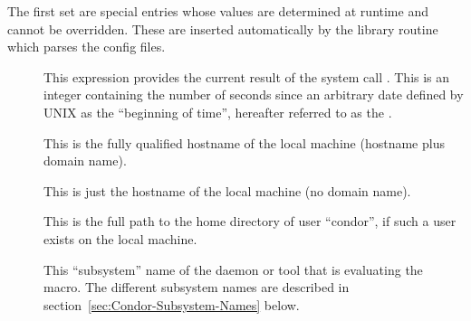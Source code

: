 The first set are special entries whose values are determined at
runtime and cannot be overridden.  These are inserted automatically by
the library routine which parses the config files.
\begin{description}
  
\item[] \label{param:CurrentTime} This expression
  provides the current result of the system call .  This
  is an integer containing the number of seconds since an arbitrary
  date defined by UNIX as the ``beginning of time'', hereafter
  referred to as the .
  
\item[] \label{param:FullHostname} This is the
  fully qualified hostname of the local machine (hostname plus domain
  name).
  
\item[] \label{param:Hostname} This is just the
  hostname of the local machine (no domain name).
  
\item[] \label{param:Tilde} This is the full path to the
  home directory of user ``condor'', if such a user exists on the
  local machine.

\item[] \label{param:Subsystem} This ``subsystem''
  name of the daemon or tool that is evaluating the macro.  The
  different subsystem names are described in
  section~\ref{sec:Condor-Subsystem-Names} below.

\end{description}

